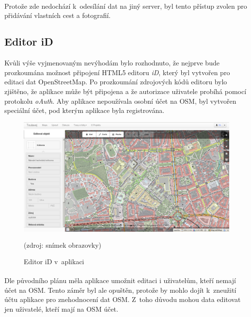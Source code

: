 \documentclass[11pt,a4paper,titlepage,oneside]{book}
\begin{document}
				\paragraph{} Protože zde nedochází k~odesílání dat na jiný server, byl tento přístup zvolen pro přidávání vlastních cest a fotografií.
			\subsection{Editor iD} 
				\paragraph{} Kvůli výše vyjmenovaným nevýhodám bylo rozhodnuto, že nejprve bude prozkoumána možnost připojení HTML5 editoru \textit{iD}, který byl vytvořen pro editaci dat OpenStreetMap. Po prozkoumání zdrojových kódů editoru bylo zjištěno, že aplikace může být připojena a že autorizace uživatele probíhá pomocí protokolu \textit{oAuth}. Aby aplikace nepoužívala osobní účet na \acl{OSM}, byl vytvořen speciální účet, pod kterým aplikace byla registrována. 

		\begin{figure}[!h]
			\begin{center}
				\includegraphics[width=12cm]{obrazky/toulavej/idToulavej.png}
				\caption{Editor iD v~aplikaci }
				\label{fig:idToulavej}
				(zdroj: snímek obrazovky)
			\end{center}
		\end{figure}	

				\paragraph{} Dle původního plánu měla aplikace umožnit editaci i uživatelům, kteří nemají účet na \acl{OSM}. Tento záměr byl ale opuštěn, protože by mohlo dojít k~zneužití účtu aplikace pro znehodnocení dat \acl{OSM}. Z~toho důvodu mohou data editovat jen uživatelé, kteří mají na \ac{OSM} účet.
\end{document}
